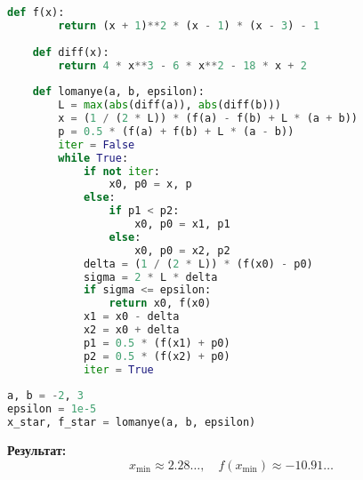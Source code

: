 \documentclass[a4paper,12pt]{article}
\begin{document}
\begin{lstlisting}[language=Python]
    def f(x):
        return (x + 1)**2 * (x - 1) * (x - 3) - 1
    
    def diff(x):
        return 4 * x**3 - 6 * x**2 - 18 * x + 2
    
    def lomanye(a, b, epsilon):
        L = max(abs(diff(a)), abs(diff(b)))
        x = (1 / (2 * L)) * (f(a) - f(b) + L * (a + b))
        p = 0.5 * (f(a) + f(b) + L * (a - b))
        iter = False
        while True:
            if not iter:
                x0, p0 = x, p
            else:
                if p1 < p2:
                    x0, p0 = x1, p1
                else:
                    x0, p0 = x2, p2
            delta = (1 / (2 * L)) * (f(x0) - p0)
            sigma = 2 * L * delta
            if sigma <= epsilon:
                return x0, f(x0)
            x1 = x0 - delta
            x2 = x0 + delta
            p1 = 0.5 * (f(x1) + p0)
            p2 = 0.5 * (f(x2) + p0)
            iter = True
    
a, b = -2, 3
epsilon = 1e-5
x_star, f_star = lomanye(a, b, epsilon)
\end{lstlisting}

\textbf{Результат:}
\[ x_{\text{min}} \approx 2.28 \ldots, \quad f(x_{\text{min}}) \approx -10.91 \ldots \]
\end{document}

